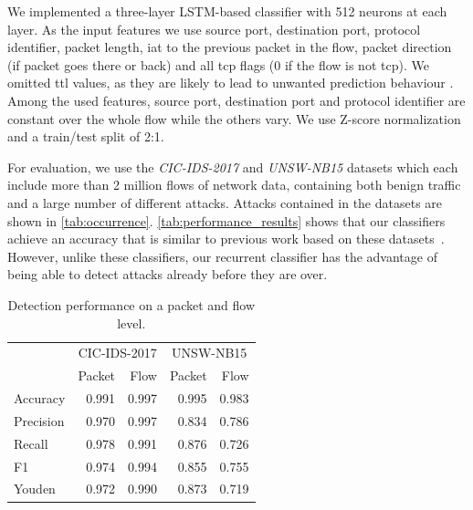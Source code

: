 \documentclass[conference]{IEEEtran}
\begin{document}
We implemented a three-layer LSTM-based classifier with 512 neurons at each layer. As the input features we use 
source port, destination port, protocol identifier, packet length, \gls{iat} to the previous packet in the flow, packet direction (if packet goes there or back) and all \gls{tcp} flags (0 if the flow is not \gls{tcp}).
We omitted \gls{ttl} values, as they are likely to lead to unwanted prediction behaviour \cite{bachl_walling_2019}.  Among the used features, source port, destination port and protocol identifier are constant over the whole flow while the others vary.
We use Z-score normalization and a train/test split of 2:1.

For evaluation, we use the \textit{CIC-IDS-2017} \cite{sharafaldin_toward_2018} and \textit{UNSW-NB15} \cite{moustafa_unsw-nb15:_2015} datasets which each include more than 2 million flows of network data, containing both benign traffic and a large number of different attacks. Attacks contained in the datasets are shown in \autoref{tab:occurrence}.
\autoref{tab:performance_results} shows that our classifiers achieve an accuracy that is similar to previous work based on these datasets~\cite{meghdouri_analysis_2018,bachl_walling_2019}. However, unlike these classifiers, our recurrent classifier has the advantage of being able to detect attacks already before they are over.

\begin{table}
\caption{Detection performance on a packet and flow level.} \label{tab:performance_results}
\centering
\begin{tabular}{l r r r r} \toprule
& \multicolumn{2}{c}{CIC-IDS-2017} & \multicolumn{2}{c}{UNSW-NB15} \\
	&	Packet	&	Flow	&	Packet	&	Flow	\\	\midrule
Accuracy	&	0.991	&	0.997	&	0.995	&	0.983	\\	
Precision	&	0.970	&	0.997	&	0.834	&	0.786	\\	
Recall	&	0.978	&	0.991	&	0.876	&	0.726	\\	
F1	&	0.974	&	0.994	&	0.855	&	0.755	\\	
Youden	&	0.972	&	0.990	&	0.873	&	0.719	\\	


\bottomrule
\end{tabular}
\end{table}
\end{document}

